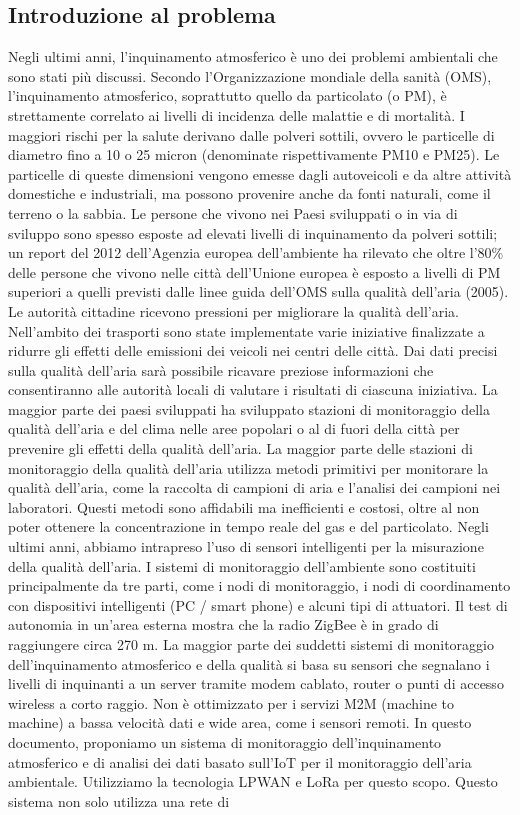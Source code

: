 \documentclass[a4paper]{report} %
\begin{document}
\subsection{Introduzione al problema}
Negli ultimi anni, l'inquinamento atmosferico è uno dei problemi ambientali che sono stati più discussi. Secondo l'Organizzazione mondiale della sanità (OMS), l'inquinamento atmosferico, soprattutto quello da particolato (o PM), è strettamente correlato ai livelli di incidenza delle malattie e di mortalità. I maggiori rischi per la salute derivano dalle polveri sottili, ovvero le particelle di diametro fino a 10 o 25 micron (denominate rispettivamente PM10 e PM25). Le particelle di queste dimensioni vengono emesse dagli autoveicoli e da altre attività domestiche e industriali, ma possono provenire anche da fonti naturali, come il terreno o la sabbia. Le persone che vivono nei Paesi sviluppati o in via di sviluppo sono spesso esposte ad elevati livelli di inquinamento da polveri sottili; un report del 2012 dell'Agenzia europea dell'ambiente ha rilevato che oltre l'80\% delle persone che vivono nelle città dell'Unione europea è esposto a livelli di PM superiori a quelli previsti dalle linee guida dell'OMS sulla qualità dell'aria (2005). Le autorità cittadine ricevono pressioni per migliorare la qualità dell'aria. Nell'ambito dei trasporti sono state implementate varie iniziative finalizzate a ridurre gli effetti delle emissioni dei veicoli nei centri delle città. Dai dati precisi sulla qualità dell'aria sarà possibile ricavare preziose informazioni che consentiranno alle autorità locali di valutare i risultati di ciascuna iniziativa. La maggior parte dei paesi sviluppati ha sviluppato stazioni di monitoraggio della qualità dell'aria e del clima nelle aree popolari o al di fuori della città per prevenire gli effetti della qualità dell'aria. La maggior parte delle stazioni di monitoraggio della qualità dell'aria utilizza metodi primitivi per monitorare la qualità dell'aria, come la raccolta di campioni di aria e l'analisi dei campioni nei laboratori. Questi metodi sono affidabili ma inefficienti e costosi, oltre al non poter ottenere la concentrazione in tempo reale del gas e del particolato. Negli ultimi anni, abbiamo intrapreso l'uso di sensori intelligenti per la misurazione della qualità dell'aria. I sistemi di monitoraggio dell'ambiente sono costituiti principalmente da tre parti, come i nodi di monitoraggio, i nodi di coordinamento con dispositivi intelligenti (PC / smart phone) e alcuni tipi di attuatori. Il test di autonomia in un'area esterna mostra che la radio ZigBee è in grado di raggiungere circa 270 m. La maggior parte dei suddetti sistemi di monitoraggio dell'inquinamento atmosferico e della qualità si basa su sensori che segnalano i livelli di inquinanti a un server tramite modem cablato, router o punti di accesso wireless a corto raggio. Non è ottimizzato per i servizi M2M (machine to machine) a bassa velocità dati e wide area, come i sensori remoti. In questo documento, proponiamo un sistema di monitoraggio dell'inquinamento atmosferico e di analisi dei dati basato sull'IoT per il monitoraggio dell'aria ambientale. Utilizziamo la tecnologia LPWAN e LoRa per questo scopo. Questo sistema non solo utilizza una rete di 
\end{document}
